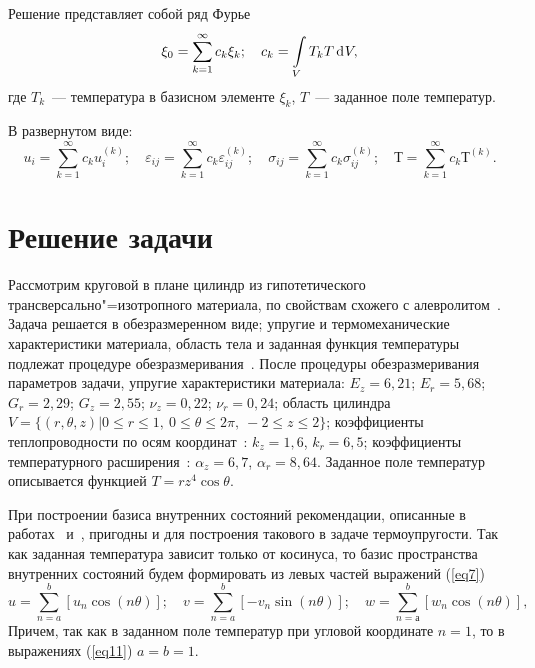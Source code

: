 \documentclass[press]{vestnik}
\begin{document}
Решение представляет собой ряд Фурье
\begin{equation}
\label{eq9}
\xi_{0} =\sum\limits_{k=1}^\infty {c_{k} \xi_{k} } ;
\quad
c_{k} =\int\limits_V {T_{k} } T\d V,
\end{equation}
где $T_{k} $~--- температура в базисном элементе $\xi_{k} $, $T$~--- 
заданное поле температур.

В развернутом виде:
\begin{equation}
\label{eq10}
u_{i} =\sum\limits_{k=1}^\infty {c_{k} u_{i}^{(k)} } ;
\quad
\varepsilon_{ij} =\sum\limits_{k=1}^\infty {c_{k} \varepsilon_{ij}^{(k)}} ;
\quad
\sigma_{ij} =\sum\limits_{k=1}^\infty {c_{k} \sigma_{ij}^{(k)} } ;
\quad
Т=\sum\limits_{k=1}^\infty {c_{k} Т^{(k)} } .
\end{equation}

\section{Решение задачи}

Рассмотрим круговой в плане цилиндр из гипотетического 
трансверсально"=изотропного материала, по свойствам схожего с алевролитом~\cite{B16}. Задача решается в обезразмеренном виде; упругие и термомеханические 
характеристики материала, область тела и заданная функция температуры 
подлежат процедуре обезразмеривания~\cite{B17}. После процедуры обезразмеривания 
параметров задачи, упругие характеристики материала: $E_{z} =6,21$; $E_{r} 
=5,68$; $G_{r} =2,29$; $G_{z} =2,55$; $\nu_{z} =0,22$; $\nu_{r} =0,24$; 
область цилиндра $V=\{ \left. (r,\theta ,z) \right| 0\leqslant r\leqslant 1,\ 0\leqslant 
\theta \leqslant 2\pi ,\ -2\leqslant z\leqslant 2\}$; коэффициенты теплопроводности по осям 
координат~\cite{B18}: $k_{z} =1,6$, $k_{r} =6,5$; коэффициенты температурного 
расширения~\cite{B19}: $\alpha_{z} =6,7$, $\alpha_{r} =8,64$. Заданное поле 
температур описывается функцией $T=r z^{4}\cos \theta $.

При построении базиса внутренних состояний рекомендации, описанные в работах~\cite{B20} и~\cite{B21}, пригодны и для построения такового в задаче термоупругости. Так 
как заданная температура зависит только от косинуса, то базис пространства 
внутренних состояний будем формировать из левых частей выражений (\ref{eq7})
\begin{equation}
\label{eq11}
u=\sum\limits_{n=a}^b {[u_{n} \cos (n\theta )]} ;
\quad
v=\sum\limits_{n=a}^b {[-v_{n} \sin (n\theta )]} ;
\quad
w=\sum\limits_{n=а}^b {[w_{n} \cos (n\theta )]} ,
\end{equation}
Причем, так как в заданном поле температур при угловой координате $n=1$, то в 
выражениях (\ref{eq11}) $a=b=1$.
\end{document}
